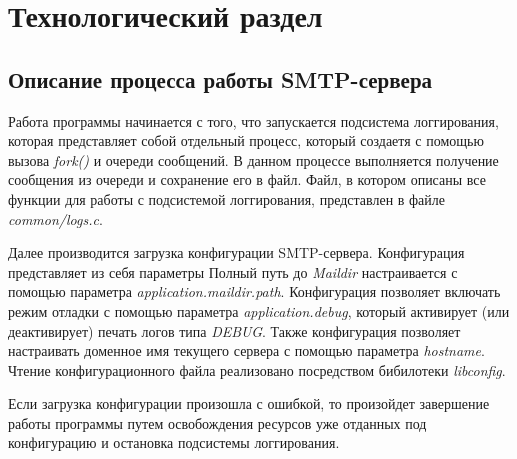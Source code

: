 \documentclass[a4paper,12pt]{report}
\begin{document}
	\chapter{Технологический раздел}


	\section{Описание процесса работы SMTP-сервера}

	Работа программы начинается с того, что запускается подсистема логгирования, 
	которая представляет собой отдельный процесс, который создаетя с помощью вызова \textit{fork()} и очереди сообщений.
	 В данном процессе выполняется получение сообщения из очереди и сохранение его в файл.
	  Файл, в котором описаны все функции для работы с подсистемой логгирования, представлен в файле \textit{common/logs.c}.


	Далее производится загрузка конфигурации SMTP-сервера.
	 Конфигурация представляет из себя параметры
	   Полный путь до \textit{Maildir} настраивается с помощью параметра \textit{application.maildir.path}.
	    Конфигурация позволяет включать режим отладки с помощью параметра \textit{application.debug}, 
		который активирует (или деактивирует) печать логов типа \textit{DEBUG}. 
		Также конфигурация позволяет настраивать доменное имя текущего сервера с помощью параметра \textit{hostname}. 
		Чтение конфигурационного файла реализовано посредством бибилотеки \textit{libconfig}.

	Если загрузка конфигурации произошла с ошибкой,
	 то произойдет завершение работы программы путем освобождения ресурсов 
	 уже отданных под конфигурацию и остановка подсистемы логгирования.
		

	

	
\end{document}

